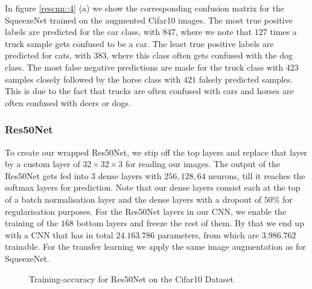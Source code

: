 \documentclass[11pt]{article}
\begin{document}
In figure \ref{rescnn::4} (a) we show the corresponding confusion matrix for the SqueezeNet trained on the augmented Cifar10 images. The most true positive labels are predicted for the car class, with $847$, where we note that $127$ times a truck sample gets confused to be a car. The least true positive labels are predicted for cats, with $383$, where this class often gets confused with the dog class. The most false negative predictions are made for the truck class with $423$ samples closely followed by the horse class with $421$ falsely predicted samples. This is due to the fact that trucks are often confused with cars and horses are often confused with deers or dogs.

\subsubsection{Res50Net}
To create our wrapped Res50Net, we stip off the top layers and replace that layer by a custom layer of $32\times 32 \times 3$ for reading our images. The output of the Res50Net gets fed into $3$ dense layers with $256, 128, 64$ neurons, till it reaches the softmax layers for prediction. Note that our dense layers consist each at the top of a batch normalisation layer and the dense layers with a dropout of $50\%$ for regularisation purposes. For the Res50Net layers in our CNN, we enable the training of the $168$ bottom layers and freeze the rest of them. By that we end up with a CNN that has in total $24.163.786$ parameters, from which are $3.986.762$ trainable. For the transfer learning we apply the same image augmentation as for SqueezeNet.

\begin{figure}
\centering
{}
  \hfill
  \hfill
\caption{Training-accuracy for Res50Net on the Cifar10 Dataset}
\label{rescnn::3}
\end{figure}
\end{document}
